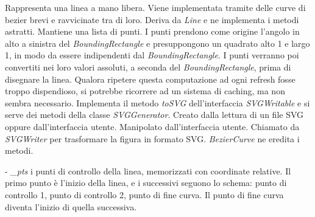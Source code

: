 Rappresenta una linea a mano libera. Viene implementata tramite delle curve di bezier brevi e ravvicinate tra di loro.
Deriva da \textit{Line} e ne implementa i metodi astratti. Mantiene una lista di punti. I punti prendono come origine l'angolo in alto a sinistra del \textit{BoundingRectangle} e presuppongono un quadrato alto 1 e largo 1, in modo da essere indipendenti dal \textit{BoundingRectangle}. I punti verranno poi convertiti nei loro valori assoluti, a seconda del \textit{BoundingRectangle}, prima di disegnare la linea. Qualora ripetere questa computazione ad ogni refresh fosse troppo dispendioso, si potrebbe ricorrere ad un sistema di caching, ma non sembra necessario. Implementa il metodo \textit{toSVG} dell'interfaccia \textit{SVGWritable} e si serve dei metodi della classe \textit{SVGGenerator}.
Creato dalla lettura di un file SVG oppure dall'interfaccia utente. Manipolato dall'interfaccia utente. Chiamato da \textit{SVGWriter} per trasformare la figura in formato SVG. \textit{BezierCurve} ne eredita i metodi.
\begin{elencopuntato}[\subsubsecindent]
\item[-] \textit{{\_}pts} i punti di controllo della linea, memorizzati con coordinate relative. Il primo punto \`e l'inizio della linea, e i successivi seguono lo schema: punto di controllo 1, punto di controllo 2, punto di fine curva. Il punto di fine curva diventa l'inizio di quella successiva.
\end{elencopuntato}
